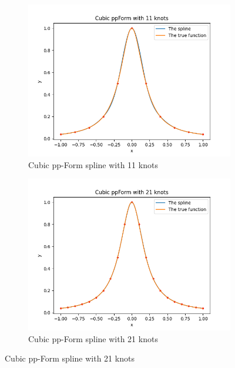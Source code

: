 \documentclass[a4paper]{article}
\begin{document}
\begin{figure}[htbp]
  \begin{subfigure}[b]{0.45\textwidth}
    \includegraphics[width = \textwidth]{../figure/Cubic ppForm with 11 knots.png}
    \caption{Cubic pp-Form spline with 11 knots}
  \end{subfigure}
  \hfill
  \begin{subfigure}[b]{0.45\textwidth}
    \includegraphics[width = \textwidth]{../figure/Cubic ppForm with 21 knots.png}
    \caption{Cubic pp-Form spline with 21 knots}
  \end{subfigure}


\end{figure}
\end{document}
